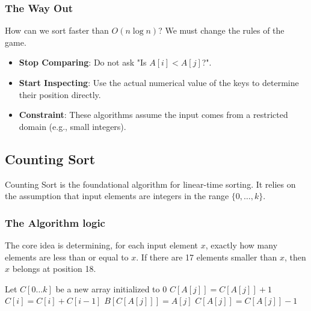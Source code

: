 \documentclass[12pt]{article}
\theoremstyle{blueplain}
\theoremstyle{bluedef}
\theoremstyle{blueremark}
\begin{document}
\subsubsection{The Way Out}
How can we sort faster than $O(n \log n)$? We must change the rules of the game.
\begin{itemize}
    \item \textbf{Stop Comparing}: Do not ask "Is $A[i] < A[j]$?".
    \item \textbf{Start Inspecting}: Use the actual numerical value of the keys to determine their position directly.
    \item \textbf{Constraint}: These algorithms assume the input comes from a restricted domain (e.g., small integers).
\end{itemize}

\subsection{Counting Sort}

Counting Sort is the foundational algorithm for linear-time sorting. It relies on the assumption that input elements are integers in the range $\{0, \dots, k\}$.

\subsubsection{The Algorithm logic}
The core idea is determining, for each input element $x$, exactly how many elements are less than or equal to $x$. If there are 17 elements smaller than $x$, then $x$ belongs at position 18.

\begin{algorithm}
    \caption{Counting Sort}\label{alg:countingSort}
    \begin{algorithmic}[1]
        \State Let $C[0 \dots k]$ be a new array initialized to 0
        \State {}
        \State $C[A[j]] = C[A[j]] + 1$
        \EndFor
        \State {}
        \State $C[i] = C[i] + C[i-1]$
        \EndFor
        \State {}
        \State {}
        \State $B[C[A[j]]] = A[j]$ 
        \State $C[A[j]] = C[A[j]] - 1$ 
        \EndFor
        \EndProcedure
    \end{algorithmic}
\end{algorithm}
\end{document}

